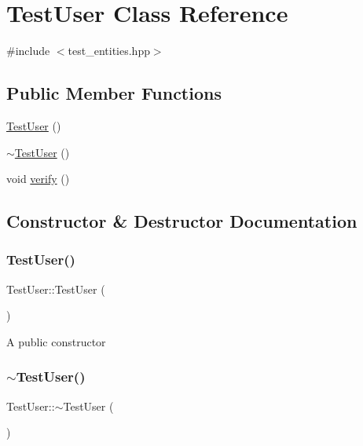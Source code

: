 \hypertarget{class_test_user}{}\section{Test\+User Class Reference}
\label{class_test_user}


{\ttfamily \#include $<$test\+\_\+entities.\+hpp$>$}

\subsection*{Public Member Functions}
\begin{DoxyCompactItemize}
\item 
\hyperlink{class_test_user_a354f63b1854bd20ce4f035379d873405}{Test\+User} ()
\item 
\hyperlink{class_test_user_a08bc61c08805c9fc8f1fbc33dfc84d21}{$\sim$\+Test\+User} ()
\item 
void \hyperlink{class_test_user_a56b28bed0e29a52c29104693e6fa04bf}{verify} ()
\end{DoxyCompactItemize}


\subsection{Constructor \& Destructor Documentation}
\mbox{\label{class_test_user_a354f63b1854bd20ce4f035379d873405}} 
\subsubsection{\texorpdfstring{Test\+User()}{TestUser()}}
{\footnotesize\ttfamily Test\+User\+::\+Test\+User (\begin{DoxyParamCaption}{ }\end{DoxyParamCaption})}

A public constructor \mbox{\label{class_test_user_a08bc61c08805c9fc8f1fbc33dfc84d21}} 
\subsubsection{\texorpdfstring{$\sim$\+Test\+User()}{~TestUser()}}
{\footnotesize\ttfamily Test\+User\+::$\sim$\+Test\+User (\begin{DoxyParamCaption}{ }\end{DoxyParamCaption})}

